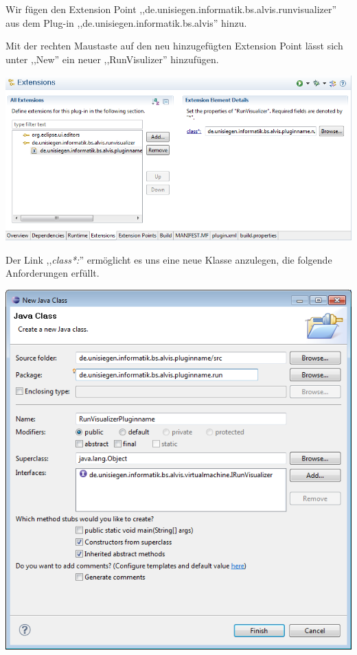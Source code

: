 \documentclass[10pt,a4paper]{article}
\begin{document}
Wir fügen den Extension Point ,,de.unisiegen.informatik.bs.alvis.runvisualizer'' aus dem Plug-in  ,,de.unisiegen.informatik.bs.alvis'' hinzu. 

Mit der rechten Maustaste auf den neu hinzugefügten Extension Point lässt sich unter ,,New'' ein neuer ,,RunVisulizer'' hinzufügen.

\begin{center}
\includegraphics[scale=0.58]{images/new_plugin_runvisualizer_01}
\end{center}

Der Link ,,\textit{class*:}'' ermöglicht es uns eine neue Klasse anzulegen, die folgende Anforderungen erfüllt.

\begin{center}
\includegraphics[scale=0.478]{images/new_plugin_runvisualizer_00}
\end{center}
\end{document}
